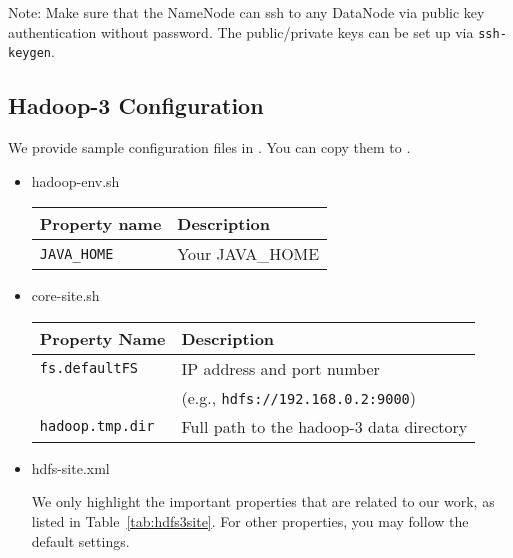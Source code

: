 \documentclass[letterpaper,12pt]{article}
\begin{document}
Note: Make sure that the NameNode can ssh to any DataNode via public key authentication
without password. The public/private keys can be set up via {\tt ssh-keygen}.

\subsection{Hadoop-3 Configuration}
We provide sample configuration files in .
You can copy them to .

\begin{itemize}

\item hadoop-env.sh

\begin{center}
\begin{tabular}{|l|l|}
\hline
{\bf Property name} & {\bf Description} \\
\hline
{\tt JAVA\_HOME} & Your JAVA\_HOME \\
\hline
\end{tabular}
\end{center}

\item core-site.sh

\begin{center}
\begin{tabular}{|p{2.5in}|p{3in}|}
\hline
{\bf Property Name} & {\bf Description} \\
\hline
{\tt fs.defaultFS}  & IP address and port number \\
		& (e.g., {\tt hdfs://192.168.0.2:9000}) \\
\hline
{\tt hadoop.tmp.dir} & Full path to the hadoop-3 data directory \\
\hline
\end{tabular}
\end{center}

\item hdfs-site.xml

We only highlight the important properties that are related to our work, as
listed in Table~\ref{tab:hdfs3site}.  For other properties, you may follow the
default settings.


\end{itemize}
\end{document}
